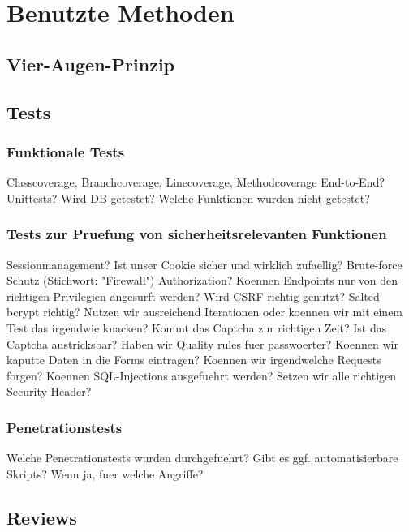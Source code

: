 \documentclass[12pt,DIV14,BCOR10mm,a4paper,twoside,parskip=half-,headsepline,headinclude,english,ngerman,bibliography=totocnumbered]{scrreprt}
\begin{document}
\tableofcontents  %

\chapter{Benutzte Methoden}
\section{Vier-Augen-Prinzip}
\section{Tests}

\subsection{Funktionale Tests}

Classcoverage, Branchcoverage, Linecoverage, Methodcoverage
End-to-End? Unittests? Wird DB getestet?
Welche Funktionen wurden nicht getestet?

\subsection{Tests zur Pruefung von sicherheitsrelevanten Funktionen}

Sessionmanagement?
Ist unser Cookie sicher und wirklich zufaellig?
Brute-force Schutz (Stichwort: "Firewall")
Authorization? Koennen Endpoints nur von den richtigen Privilegien angesurft werden?
Wird CSRF richtig genutzt?
Salted bcrypt richtig? Nutzen wir ausreichend Iterationen oder koennen wir mit einem Test das irgendwie knacken?
Kommt das Captcha zur richtigen Zeit? Ist das Captcha austricksbar?
Haben wir Quality rules fuer passwoerter?
Koennen wir kaputte Daten in die Forms eintragen?
Koennen wir irgendwelche Requests forgen?
Koennen SQL-Injections ausgefuehrt werden?
Setzen wir alle richtigen Security-Header?

\subsection{Penetrationstests}

Welche Penetrationstests wurden durchgefuehrt?
Gibt es ggf. automatisierbare Skripts?
Wenn ja, fuer welche Angriffe?

\section{Reviews}
\end{document}
